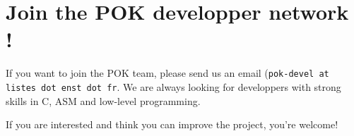 \documentclass[oneside]{article}
\begin{document}
\section{Join the POK developper network !}
If you want to join the POK team, please send us an email (\texttt{pok-devel at
listes dot enst dot fr}. We are always looking for developpers with strong
skills in C, ASM and low-level programming.

If you are interested and think you can improve the project, you're welcome!
\end{document}
